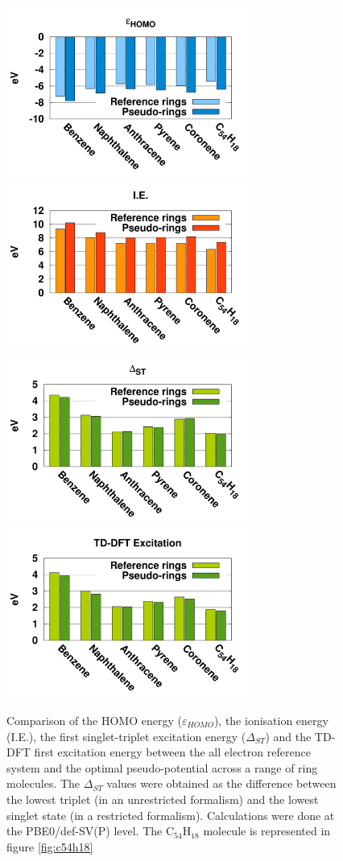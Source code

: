 \documentclass[aip]{revtex4-1}
\begin{document}
\begin{figure}
\begin{center}
\includegraphics[width=8cm]{ring_pbe0_homo}
\includegraphics[width=8cm]{ring_pbe0_ie}
\includegraphics[width=8cm]{ring_pbe0_st}
\includegraphics[width=8cm]{ring_pbe0_tddft}
\end{center}

\caption{Comparison of the HOMO energy ($\varepsilon_{HOMO}$),
the ionisation energy (I.E.),
the first singlet-triplet excitation energy ($\Delta_{ST}$) and
the TD-DFT first excitation energy
between the
all electron reference system and the optimal pseudo-potential across a range of ring molecules.
The $\Delta_{ST}$ values were obtained as the difference
between the lowest triplet (in an unrestricted formalism) and the lowest singlet state
(in a restricted formalism).
Calculations were done at the PBE0/def-SV(P) level.
The C\(_{54}\)H\(_{18}\) molecule is represented in figure \ref{fig:c54h18}}
\label{fig:rings_graphs}
\end{figure}
\end{document}
